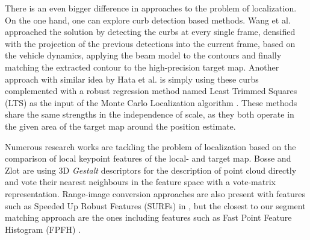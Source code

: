 \documentclass[letterpaper, 10 pt, conference]{ieeeconf}  %
\begin{document}
There is an even bigger difference in approaches to the problem of localization. On the one hand, one can explore curb detection based methods. Wang et al. \cite{curb} approached the solution by detecting the curbs at every single frame, densified with the projection of the previous detections into the current frame, based on the vehicle dynamics, applying the beam model to the contours and finally matching the extracted contour to the high-precision target map. Another approach with similar idea by Hata et al. \cite{curb_mc} is simply using these curbs complemented with a robust regression method named Least Trimmed Squares (LTS) as the input of the Monte Carlo Localization algorithm \cite{monte-carlo}. These methods share the same strengths in the independence of scale, as they both operate in the given area of the target map around the position estimate.

Numerous research works are tackling the problem of localization based on the comparison of local keypoint features of the local- and target map. Bosse and Zlot \cite{bosse-zlot} are using 3D \textit{Gestalt} descriptors for the description of point cloud directly and vote their nearest neighbours in the feature space with a vote-matrix representation. Range-image conversion approaches are also present with features such as Speeded Up Robust Features (SURFs) in \cite{surf1, surf2}, but the closest to our segment matching approach are the ones including features such as Fast Point Feature Histogram (FPFH) \cite{fpfh}.
\end{document}
